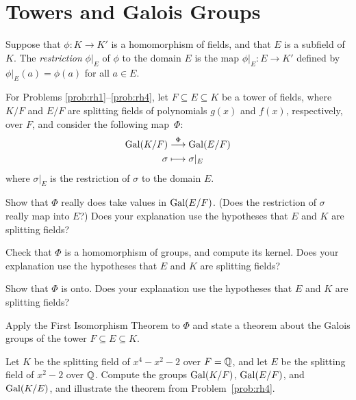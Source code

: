 \section{Towers and Galois Groups}

\begin{definition}
    Suppose that $\phi:K \longrightarrow K'$ is a homomorphism of fields, and that $E$ is a subfield of $K$. The \textit{restriction} $\phi|_E$ of $\phi$ to the domain $E$ is the map $\phi|_E : E \longrightarrow K'$ defined by $\phi|_E(a)=\phi(a)$ for all $a\in E$.
\end{definition}

For Problems \ref{prob:rh1}--\ref{prob:rh4},
let $F\subseteq E\subseteq K$ be a tower of fields, where $K/F$ and $E/F$ are splitting fields of polynomials $g(x)$ and $f(x)$, respectively, over $F$, and consider the following map~$\Phi$:
\begin{align*}
\operatorname{Gal}(K/F) &\stackrel{\Phi}{\longrightarrow} \operatorname{Gal}(E/F) \\
\sigma &\longmapsto \sigma|_E
\end{align*}
where $\sigma|_E$ is the restriction of $\sigma$ to the domain $E$.

\begin{problem}\label{prob:rh1}
    Show that $\Phi$ really does take values in $\operatorname{Gal}(E/F)$. (Does the restriction of $\sigma$ really map into $E$?) Does your explanation use the hypotheses that $E$ and $K$ are splitting fields?
\end{problem}


\begin{problem}
Check that $\Phi$ is a homomorphism of groups, and compute its kernel. Does your explanation use the hypotheses that $E$ and $K$ are splitting fields?
\end{problem}


\begin{problem}
Show that $\Phi$ is onto. Does your explanation use the hypotheses that $E$ and $K$ are splitting fields?
\end{problem}



\begin{problem}\label{prob:rh4}
    Apply the First Isomorphism Theorem to $\Phi$ and state a theorem about the Galois groups of the tower $F\subseteq E \subseteq K$.
\end{problem}



\begin{problem}
    Let $K$ be the splitting field of $x^4-x^2-2$ over $F=\mathbb{Q}$, and let $E$ be the splitting field of $x^2-2$ over $\mathbb{Q}$. Compute the groups $\operatorname{Gal}(K/F)$, $\operatorname{Gal}(E/F)$, and $\operatorname{Gal}(K/E)$, and illustrate the theorem from Problem~\ref{prob:rh4}.
\end{problem}




